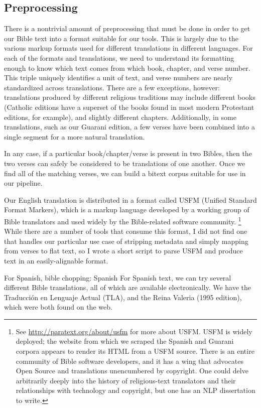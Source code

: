 \subsection{Preprocessing}
There is a nontrivial amount of preprocessing that must be done in order to get
our Bible text into a format suitable for our tools.
This is largely due to the various markup formats used for different
translations in different languages. For each of the formats and translations,
we need to understand its formatting enough to know which text comes from
which book, chapter, and verse number. This triple uniquely identifies a
unit of text, and verse numbers are nearly standardized across translations.
There are a few exceptions, however: translations produced by different
religious traditions may include different books (Catholic editions have
a superset of the books found in most modern Protestant editions, for example),
and slightly different chapters. Additionally, in some translations, such as
our Guarani edition, a few verses have been combined into a single segment for
a more natural translation.

In any case, if a particular book/chapter/verse is present in two Bibles, then
the two verses can safely be considered to be translations of one
another. Once we find all of the matching verses, we can build a bitext corpus
suitable for use in our pipeline.

Our English translation is distributed in a format called USFM (Unified
Standard Format Markers), which is a markup language developed by a working
group of Bible translators and used widely by the Bible-related software
community.
\footnote{See \url{http://paratext.org/about/usfm} for more about USFM. USFM is
widely deployed; the website from which we scraped the Spanish and Guarani
corpora appears to render its HTML from a USFM source. 
There is an entire community of Bible software developers, and it has a wing
that advocates Open Source and translations unencumbered by copyright.  One
could delve arbitrarily deeply into the history of religious-text translators
and their relationships with technology and copyright, but one has an NLP
dissertation to write.}
While there are a number of tools that consume this format, I did not find one
that handles our particular use case of stripping metadata and simply mapping
from verses to flat text, so I wrote a short script to parse USFM and produce
text in an easily-alignable format.


For Spanish, 
bible chopping: Spanish
For Spanish text, we can try several different Bible translations, all of which
are available electronically.
We have the Traducción en Lenguaje Actual (TLA), and the Reina Valeria (1995
edition), which were both found on the web.

